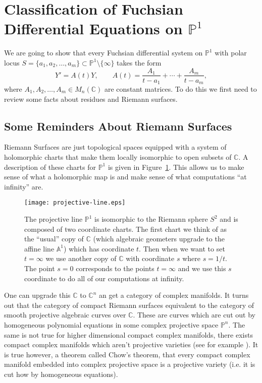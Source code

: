\documentclass[]{book}
\numberwithin{equation}{section}
\theoremstyle{definition}
\theoremstyle{remark}
\newcommand{\CC}{\mathbb{C}}
\renewcommand{\AA}{\mathbb{A}}
\newcommand{\PP}{\mathbb{P}}
\begin{document}
\section[Classification of Fuchsian Equations]{Classification of Fuchsian Differential Equations on $\PP^1$}
We are going to show that every Fuchsian differential system on $\PP^1$ with polar locus $S = \lbrace a_1,a_2,\ldots, a_m\rbrace \subset \PP^1\setminus \lbrace \infty \rbrace$ takes the form  
 $$ Y' = A(t) Y, \qquad A(t) = \frac{A_1}{t-a_1} + \cdots + \frac{A_m}{t-a_m},$$
where $A_1,A_2,\ldots, A_m \in M_n(\CC)$ are constant matrices.
To do this we first need to review some facts about residues and Riemann surfaces.


\subsection{Some Reminders About Riemann Surfaces}
Riemann Surfaces are just topological spaces equipped with a system of holomorphic charts that make them locally isomorphic to open subsets of $\CC$. 
A description of these charts for $\PP^1$ is given in Figure~\ref{F:projective-line}.
This allows us to make sense of what a holomorphic map is and make sense of what computations ``at infinity'' are. 

\begin{figure}[h]\label{F:projective-line}
	\begin{center}
		\texttt{[image: projective-line.eps]}
	\end{center}
	\caption{The projective line $\PP^1$ is isomorphic to the Riemann sphere $S^2$ and is composed of two coordinate charts. 
		The first chart we think of as the ``usual'' copy of $\CC$ (which algebraic geometers upgrade to the affine line $\AA^1$) which has coordinate $t$. 
		Then when we want to set $t=\infty$ we use another copy of $\CC$ with coordinate $s$ where $s=1/t$.
		The point $s=0$ corresponds to the points $t=\infty$ and we use this $s$ coordinate to do all of our computations at infinity. }
\end{figure}

One can upgrade this $\CC$ to $\CC^n$ an get a category of complex manifolds. 
It turns out that the category of compact Riemann surfaces equivalent to the category of smooth projective algebraic curves over $\CC$.
These are curves which are cut out by homogeneous polynomial equations in some complex projective space $\PP^n$. 
The same is not true for higher dimensional compact complex manifolds, there exists compact complex manifolds which aren't projective varieties (see for example \cite[pg 161]{Shafarevich2013}). 
It is true however, a theorem called Chow's theorem, that every compact complex manifold embedded into complex projective space is a projective variety (i.e. it is cut how by homogeneous equations). 
\end{document}
